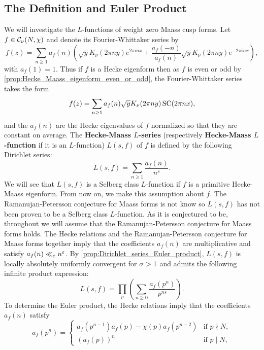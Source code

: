     \subsection*{The Definition and Euler Product}
      We will investigate the $L$-functions of weight zero Maass cusp forms. Let $f \in \mathcal{C}_{\nu}(N,\chi)$ and denote its Fourier-Whittaker series by
      \[
        f(z) = \sum_{n \ge 1}a_{f}(n)\left(\sqrt{y}K_{\nu}(2\pi ny)e^{2\pi inx}+\frac{a_{f}(-n)}{a_{f}(n)}\sqrt{y}K_{\nu}(2\pi ny)e^{-2\pi inx}\right),
      \]
      with $a_{f}(1) = 1$. Thus if $f$ is a Hecke eigenform then as $f$ is even or odd by \cref{prop:Hecke_Maass_eigenform_even_or_odd}, the Fourier-Whittaker series takes the form
      \[
        f(z) = \sum_{n \ge 1}a_{f}(n)\sqrt{y}K_{\nu}(2\pi ny)\operatorname{\mathrm{SC}}(2\pi nx),
      \]
      and the $a_{f}(n)$ are the Hecke eigenvalues of $f$ normalized so that they are constant on average. The \textbf{Hecke-Maass $L$-series} (respectively \textbf{Hecke-Maass $L$-function} if it is an $L$-function) $L(s,f)$ of $f$ is defined by the following Dirichlet series:
      \[
        L(s,f) = \sum_{n \ge 1}\frac{a_{f}(n)}{n^{s}}.
      \]
      We will see that $L(s,f)$ is a Selberg class $L$-function if $f$ is a primitive Hecke-Maass eigenform. From now on, we make this assumption about $f$. The Ramanujan-Petersson conjecture for Maass forms is not know so $L(s,f)$ has not been proven to be a Selberg class $L$-function. As it is conjectured to be, throughout we will assume that the Ramanujan-Petersson conjecture for Maass forms holds. The Hecke relations and the Ramanujan-Petersson conjecture for Maass forms together imply that the coefficients $a_{f}(n)$ are multiplicative and satisfy $a_{f}(n) \ll_{\varepsilon} n^{\varepsilon}$. By \cref{prop:Dirichlet_series_Euler_product}, $L(s,f)$ is locally absolutely uniformly convergent for $\sigma > 1$ and admits the following infinite product expression:
      \[
        L(s,f) = \prod_{p}\left(\sum_{n \ge 0}\frac{a_{f}(p^{n})}{p^{ns}}\right).
      \]
      To determine the Euler product, the Hecke relations imply that the coefficients $a_{f}(n)$ satisfy
      \begin{equation}\label{equ:primitive_Hecke_eigenform_recurrence_for_coefficients_of_Maass_L-function}
        a_{f}(p^{n}) = \begin{cases} a_{f}(p^{n-1})a_{f}(p)-\chi(p)a_{f}(p^{n-2}) & \text{if $p \nmid N$}, \\ (a_{f}(p))^{n} & \text{if $p \mid N$}, \end{cases}
      \end{equation}
